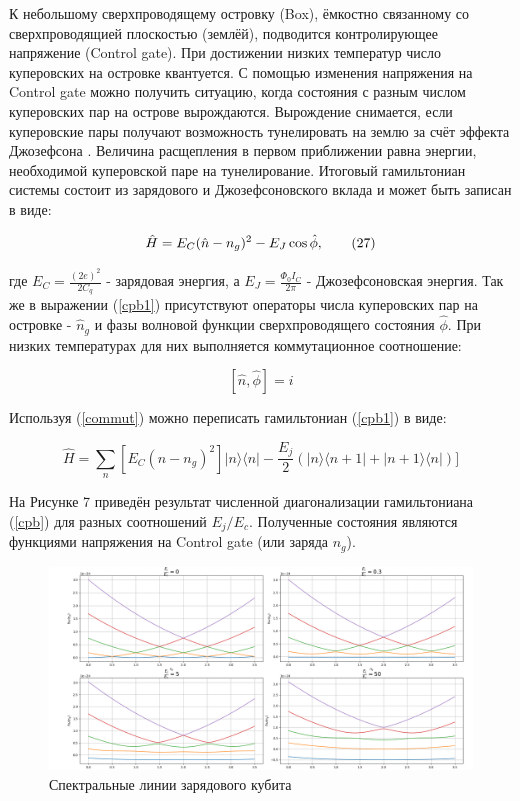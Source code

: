 К небольшому сверхпроводящему островку (Box), ёмкостно связанному со сверхпроводящией плоскостью (землёй), подводится контролирующее напряжение (Control gate). При достижении низких температур число куперовских на островке квантуется.  С помощью изменения напряжения на Control gate можно получить ситуацию, когда состояния с разным числом куперовских пар на острове вырождаются. Вырождение снимается, если куперовские пары получают возможность тунелировать на землю за счёт эффекта Джозефсона \cite{Wendin2005}. Величина расщепления в первом приближении равна энергии, необходимой куперовской паре на тунелирование. Итоговый гамильтониан системы состоит из зарядового и Джозефсоновского вклада и может быть записан в виде:

\begin{equation}
\hat H = E_C (\hat n - n_g)^2 - E_J \cos {\hat \phi}, 
\label{cpb1}
\tag{27}
\\
\end{equation}

\noindent где $E_C = \frac{(2e)^2}{2C_q}$ - зарядовая энергия, а $E_J = \frac{\Phi_0 I_C}{2\pi}$ - Джозефсоновская энергия. Так же в выражении  (\ref{cpb1}) присутствуют операторы числа куперовских пар на островке - $\hat n_g$  и фазы волновой функции сверхпроводящего состояния $\hat \phi$. При низких температурах для них выполняется коммутационное соотношение: 

\begin{equation}
\label{commut}
\tag{28}
[\hat n, \hat \phi ] = i
\end{equation}

Используя (\ref{commut}) можно переписать гамильтониан (\ref{cpb1}) в виде:

\begin{equation}
\tag{29}
\label{cpb}
\hat H  = \sum_n [E_C(n-n_g)^2]|n\rangle\langle n| - \frac{E_j}{2}(|n\rangle\langle n+1|+|n+1\rangle\langle n|)]
\end{equation} 


На Рисунке 7 приведён результат численной диагонализации гамильтониана (\ref{cpb}) для разных соотношений $E_j/ E_c$. Полученные состояния являются функциями напряжения на Control gate (или заряда $n_g$).
\begin{figure}[h]
	\centering
	\includegraphics[width=0.9\linewidth]{pictures/cpb}
	\caption{Спектральные линии зарядового кубита}
	\label{fig:cpb}
\end{figure}

